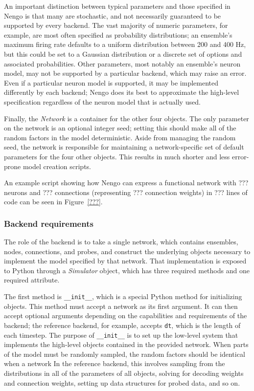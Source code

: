 \documentclass{frontiersSCNS}
\begin{document}
An important distinction between typical
parameters and those specified in Nengo
is that many are stochastic,
and not necessarily guaranteed
to be supported by every backend.
The vast majority of numeric parameters,
for example,
are most often specified as probability distributions;
an ensemble's maximum firing rate defaults to
a uniform distribution between 200 and 400 Hz,
but this could be set to a Gaussian distribution
or a discrete set of options and associated
probabilities.
Other parameters,
most notably an ensemble's neuron model,
may not be supported by a particular backend,
which may raise an error.
Even if a particular neuron model is supported,
it may be implemented differently by each backend;
Nengo does its best to approximate
the high-level specification regardless of
the neuron model that is actually used.

Finally, the \textit{Network} is a
container for the other four objects.
The only parameter on the network
is an optional integer seed;
setting this should make
all of the random factors
in the model deterministic.
Aside from managing the random seed,
the network is responsible for maintaining
a network-specific set of default parameters
for the four other objects.
This results in much shorter and less error-prone
model creation scripts.

An example script showing how Nengo can
express a functional network
with ??? neurons and ??? connections
(representing ??? connection weights)
in ??? lines of code can be seen
in Figure~\ref{???}.

\subsubsection{Backend requirements}

The role of the backend is to take
a single network, which contains
ensembles, nodes, connections, and probes,
and construct the underlying objects necessary
to implement the model specified by that network.
That implementation is exposed to Python
through a \textit{Simulator} object,
which has three required methods
and one required attribute.

The first method is \texttt{\_\_init\_\_},
which is a special Python method for initializing objects.
This method must accept a network as its first argument.
It can then accept optional arguments depending on
the capabilities and requirements of the backend;
the reference backend, for example,
accepts \texttt{dt},
which is the length of each timestep.
The purpose of \texttt{\_\_init\_\_} is to
set up the low-level system
that implements the high-level objects
contained in the provided network.
When parts of the model must be
randomly sampled, the random factors
should be identical when a network
In the reference backend,
this involves sampling from the distributions
in all of the parameters of all objects,
solving for decoding weights and connection weights,
setting up data structures for probed data,
and so on.
\end{document}
